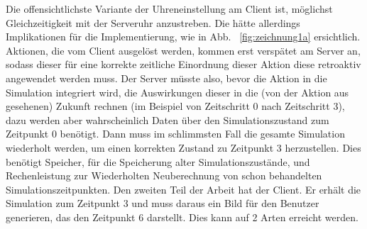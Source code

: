 Die offensichtlichste Variante der Uhreneinstellung am Client ist, möglichst Gleichzeitigkeit mit der Serveruhr anzustreben. Die hätte allerdings Implikationen für die Implementierung, wie in Abb. ~\ref{fig:zeichnung1a} ersichtlich. Aktionen, die vom Client ausgelöst werden, kommen erst verspätet am Server an, sodass dieser für eine korrekte zeitliche Einordnung dieser Aktion diese retroaktiv angewendet werden muss. Der Server müsste also, bevor die Aktion in die Simulation integriert wird, die Auswirkungen dieser in die (von der Aktion aus gesehenen) Zukunft rechnen (im Beispiel von Zeitschritt 0 nach Zeitschritt 3), dazu werden aber wahrscheinlich Daten über den Simulationszustand zum Zeitpunkt 0 benötigt. Dann muss im schlimmsten Fall die gesamte Simulation wiederholt werden, um einen korrekten Zustand zu Zeitpunkt 3 herzustellen. Dies benötigt Speicher, für die Speicherung alter Simulationszustände, und Rechenleistung zur Wiederholten Neuberechnung von schon behandelten Simulationszeitpunkten. Den zweiten Teil der Arbeit hat der Client. Er erhält die Simulation zum Zeitpunkt 3 und muss daraus ein Bild für den Benutzer generieren, das den Zeitpunkt 6 darstellt. Dies kann auf 2 Arten erreicht werden.
